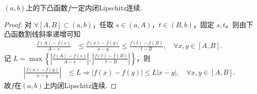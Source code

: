 \documentclass[../../main.tex]{subfiles}%
\begin{document}
\begin{theorem}[开区间上的下凸函数内闭Lipschitz连续]\label{theorem:开区间上的下凸函数一定内闭Lipschitz连续}
\((a,b)\)上的下凸函数\(f\)一定内闭Lipschitz连续.
\end{theorem}
\begin{proof}
对 $\forall [A,B] \subset (a,b)$，任取 $s\in (a,A)$，$t\in (B,b)$，固定 $s,t$。则由下凸函数割线斜率递增可知
\begin{align*}
\frac{f(A) - f(s)}{A - s} &\leqslant \frac{f(x) - f(y)}{x - y} \leqslant \frac{f(t) - f(B)}{t - B}, \quad \forall x,y\in [A,B].
\end{align*}
记 $L = \max\left\{\left|\frac{f(A) - f(s)}{A - s}\right|, \left|\frac{f(t) - f(B)}{t - B}\right|\right\}$，则
\begin{align*}
\left|\frac{f(x) - f(y)}{x - y}\right| &\leqslant L \Rightarrow \left|f(x) - f(y)\right| \leqslant L\left|x - y\right|, \quad \forall x,y\in [A,B].
\end{align*}
故\(f\)在$(a,b)$上内闭Lipschitz连续.
\end{proof}
\end{document}
